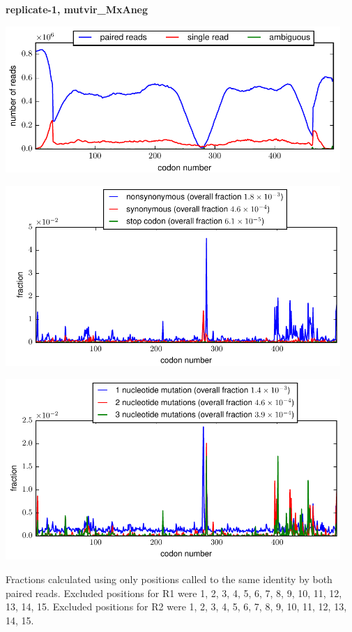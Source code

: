 \documentclass[10pt,letterpaper]{article}
\begin{document}
\centerline{\Large \bf replicate-1, mutvir\_MxAneg}
\vspace{0.1in}

\centerline{\includegraphics[width=5in]{replicate-1-mutvir_MxAneg_codondepth.pdf}}
\vspace{0.1in}

\centerline{\includegraphics[width=5in]{replicate-1-mutvir_MxAneg_syn-ns-dist.pdf}}
\vspace{0.1in}

\centerline{\includegraphics[width=5in]{replicate-1-mutvir_MxAneg_nmutspercodon-dist.pdf}}
\vspace{0.1in}

Fractions calculated using only positions called to the same identity by both paired reads.  Excluded positions for R1 were 1, 2, 3, 4, 5, 6, 7, 8, 9, 10, 11, 12, 13, 14, 15. 
 Excluded positions for R2 were 1, 2, 3, 4, 5, 6, 7, 8, 9, 10, 11, 12, 13, 14, 15. 
\end{document}
